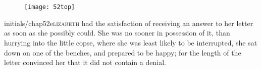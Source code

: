 \chapter[Chapter \thechapter]{}
	
	
\begin{figure}[t!]
\centering
\texttt{[image: 52top]}
\end{figure}


\lettrine[lines=6,image=true]{initials/chap52e}{lizabeth}  had the satisfaction of receiving an answer to her letter as soon as she possibly could. She was no sooner in possession of it, than hurrying into the little copse, where she was least likely to be interrupted, she sat down on one of the benches, and prepared to be happy; for the length of the letter convinced her that it did not contain a denial.

\pagebreak[4]

